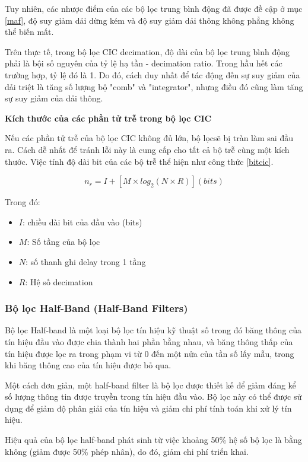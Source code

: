 Tuy nhiên, các nhược điểm của các bộ lọc trung bình động đã được đề cập ở mục \ref{maf}, độ suy giảm dải dừng kém và độ suy giảm dải thông không phẳng không thể biến mất.

Trên thực tế, trong bộ lọc CIC decimation, độ dài của bộ lọc trung bình động phải là bội số nguyên của tỷ lệ hạ tần - decimation ratio. Trong hầu hết các trường hợp, tỷ lệ đó là 1. Do đó, cách duy nhất để tác động đến sự suy giảm của dải triệt là tăng số lượng bộ "comb" và "integrator", nhưng điều đó cũng làm tăng sự suy giảm của dải thông.

\textbf{Kích thước của các phần tử trễ trong bộ lọc CIC}

Nếu các phần tử trễ của bộ lọc CIC không đủ lớn, bộ lọcsẽ bị tràn làm sai đầu ra. Cách dễ nhất để tránh lỗi này là cung cấp cho tất cả bộ trễ cùng một kích thước. Việc tính độ dài bit của các bộ trễ thể hiện như công thức \ref{bitcic}.

\begin{equation} \label{bitcic}
    n_r = I + [M \times log_2(N \times R)] (bits)
\end{equation}

Trong đó:
\begin{itemize}
    \item $I$: chiều dài bit của đầu vào (bits)
    \item $M$: Số tầng của bộ lọc
    \item $N$: số thanh ghi delay trong 1 tầng
    \item $R$: Hệ số decimation
\end{itemize}
\subsubsection{Bộ lọc Half-Band (Half-Band Filters)}
Bộ lọc Half-band là một loại bộ lọc tín hiệu kỹ thuật số trong đó băng thông của tín hiệu đầu vào được chia thành hai phần bằng nhau, và băng thông thấp của tín hiệu được lọc ra trong phạm vi từ 0 đến một nửa của tần số lấy mẫu, trong khi băng thông cao của tín hiệu được bỏ qua.

Một cách đơn giản, một half-band filter là bộ lọc được thiết kế để giảm đáng kể số lượng thông tin được truyền trong tín hiệu đầu vào. Bộ lọc này có thể được sử dụng để giảm độ phân giải của tín hiệu và giảm chi phí tính toán khi xử lý tín hiệu.

 Hiệu quả của bộ lọc half-band phát sinh từ việc khoảng 50\% hệ số bộ lọc là bằng không (giảm được 50\% phép nhân), do đó, giảm chi phí triển khai. \cite{half_band}

